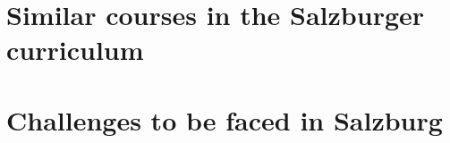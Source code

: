 \documentclass[a4paper,11pt]{article}
\begin{document}
\section*{Similar courses in the Salzburger curriculum}


\section*{Challenges to be faced in Salzburg}







\newpage

\end{document}
